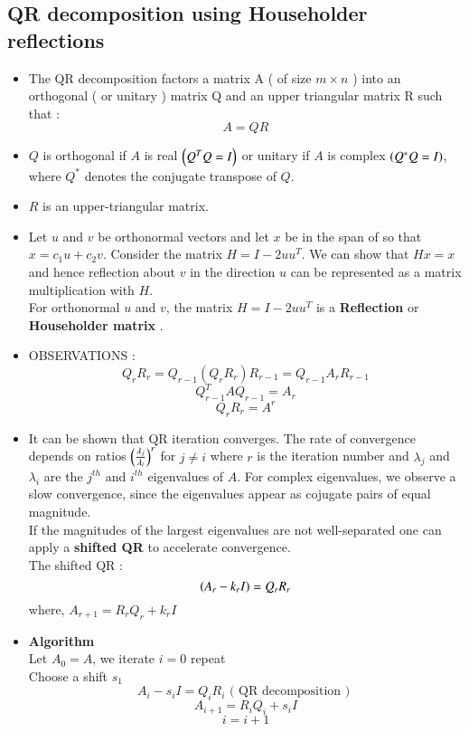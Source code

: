\documentclass[report,12pt,onecolumn]{IEEEtran}
\theoremstyle{remark}
\begin{document}
\begin{itemize}
		\subsection{QR decomposition using Householder reflections}
		\begin{itemize}
			\item The QR decomposition factors a matrix A ( of size $m \times n$ ) into an orthogonal ( or unitary ) matrix Q and an upper triangular matrix R such that :
				$$ A = QR $$
			\item $Q$ is orthogonal if $A$ is real $\left(Q^T Q = I\right)$ or unitary if $A$ is complex $\left(Q^{*} Q = I\right)$, where $Q^{*}$ denotes the conjugate transpose of $Q$.
			\item $R$ is an upper-triangular matrix.
			\item Let $u$ and $v$ be orthonormal vectors and let $x$ be in the span of  so that $x = c_1 u + c_2 v$. Consider the matrix $H = I - 2uu^T $. We can show that $Hx = x$ and hence reflection about $v$ in the direction $u$ can be represented as a matrix multiplication with $H$. \\
				For orthonormal $u$ and $v$, the matrix $H = I - 2uu^T $ is a \textbf{Reflection} or \textbf{Householder matrix} .
			\item OBSERVATIONS : \\
				$$ Q_r R_r = Q_{r-1} (Q_r R_r) R_{r-1} = Q_{r-1} A_r R_{r-1} $$
				$$ Q_{r-1}^T A Q_{r-1} = A_r $$
				$$ Q_r R_r = A^r $$
			\item It can be shown that QR iteration converges. The rate of convergence depends on ratios $\left(\frac{\lambda_j}{\lambda_i}\right)^r$ for $j \neq i$ where $r$ is the iteration number and $\lambda_j$ and $\lambda_i$ are the $j^{th}$ and $i^{th}$ eigenvalues of $A$. For complex eigenvalues, we observe a slow convergence, since the eigenvalues appear as cojugate pairs of equal magnitude. \\
				If the magnitudes of the largest eigenvalues are not well-separated one can apply a \textbf{shifted QR} to accelerate convergence. \\
				The shifted QR : 
				$$ \left(A_r - k_r I\right) = Q_r R_r $$
				where, $A_{r+1} = R_r Q_r + k_r I $
			\item \textbf{Algorithm} \\
				Let $A_0 = A$, we iterate $i=0$ repeat \\
					Choose a shift $s_1$
					$$ A_i - s_i I = Q_i R_i \text{ ( QR decomposition ) }$$
					$$ A_{i+1} = R_i Q_i + s_i I $$
					$$ i = i + 1 $$

\end{itemize}
\end{itemize}
\end{document}
